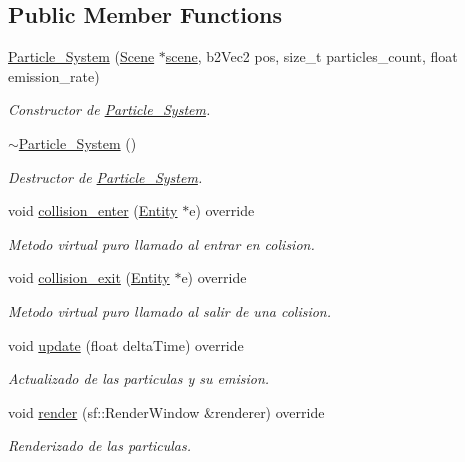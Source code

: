 \subsection*{Public Member Functions}
\begin{DoxyCompactItemize}
\item 
\mbox{\hyperlink{classexample_1_1_particle___system_abd7f7fe25292f0230990bc2421b5c9bc}{Particle\+\_\+\+System}} (\mbox{\hyperlink{classexample_1_1_scene}{Scene}} $\ast$\mbox{\hyperlink{classexample_1_1_entity_ab851dbde4a16829f9fb77ab9a66b9f1e}{scene}}, b2\+Vec2 pos, size\+\_\+t particles\+\_\+count, float emission\+\_\+rate)
\begin{DoxyCompactList}\small\item\em Constructor de \mbox{\hyperlink{classexample_1_1_particle___system}{Particle\+\_\+\+System}}. \end{DoxyCompactList}\item 
\mbox{\hyperlink{classexample_1_1_particle___system_ad374180f0e79cc239483ad82ed62e217}{$\sim$\+Particle\+\_\+\+System}} ()
\begin{DoxyCompactList}\small\item\em Destructor de \mbox{\hyperlink{classexample_1_1_particle___system}{Particle\+\_\+\+System}}. \end{DoxyCompactList}\item 
void \mbox{\hyperlink{classexample_1_1_particle___system_a7abd68650036023393e7bb7cc5d28d49}{collision\+\_\+enter}} (\mbox{\hyperlink{classexample_1_1_entity}{Entity}} $\ast$e) override
\begin{DoxyCompactList}\small\item\em Metodo virtual puro llamado al entrar en colision. \end{DoxyCompactList}\item 
void \mbox{\hyperlink{classexample_1_1_particle___system_a82dfe08a8910532c5cd6a0a50fb79f23}{collision\+\_\+exit}} (\mbox{\hyperlink{classexample_1_1_entity}{Entity}} $\ast$e) override
\begin{DoxyCompactList}\small\item\em Metodo virtual puro llamado al salir de una colision. \end{DoxyCompactList}\item 
void \mbox{\hyperlink{classexample_1_1_particle___system_a28602cfbbff3c7762da1ccbc7324f8f8}{update}} (float delta\+Time) override
\begin{DoxyCompactList}\small\item\em Actualizado de las particulas y su emision. \end{DoxyCompactList}\item 
void \mbox{\hyperlink{classexample_1_1_particle___system_aed070ca0042af0428dd942fe4f1e0241}{render}} (sf\+::\+Render\+Window \&renderer) override
\begin{DoxyCompactList}\small\item\em Renderizado de las particulas. \end{DoxyCompactList}\end{DoxyCompactItemize}
